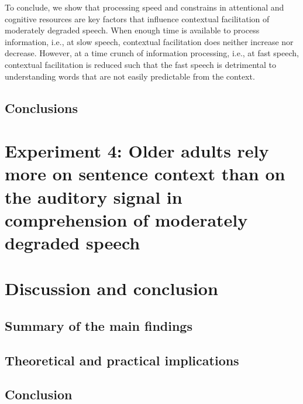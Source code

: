 \documentclass[a4paper, nobind]{templates/ociamthesis}
\begin{document}
To conclude, we show that processing speed and constrains in attentional and cognitive resources are key factors that influence contextual facilitation of moderately degraded speech.
When enough time is available to process information, i.e., at slow speech, contextual facilitation does neither increase nor decrease.
However, at a time crunch of information processing, i.e., at fast speech, contextual facilitation is reduced such that the fast speech is detrimental to understanding words that are not easily predictable from the context.

\hypertarget{conclusions}{%
\section{Conclusions}\label{conclusions}}

\hypertarget{experiment-4-older-adults-rely-more-on-sentence-context-than-on-the-auditory-signal-in-comprehension-of-moderately-degraded-speech}{%
\chapter{Experiment 4: Older adults rely more on sentence context than on the auditory signal in comprehension of moderately degraded speech}\label{experiment-4-older-adults-rely-more-on-sentence-context-than-on-the-auditory-signal-in-comprehension-of-moderately-degraded-speech}}

\hypertarget{discussion-and-conclusion}{%
\chapter{Discussion and conclusion}\label{discussion-and-conclusion}}

\hypertarget{summary-of-the-main-findings}{%
\section{Summary of the main findings}\label{summary-of-the-main-findings}}

\hypertarget{theoretical-and-practical-implications}{%
\section{Theoretical and practical implications}\label{theoretical-and-practical-implications}}

\hypertarget{conclusion}{%
\section{Conclusion}\label{conclusion}}
\end{document}

